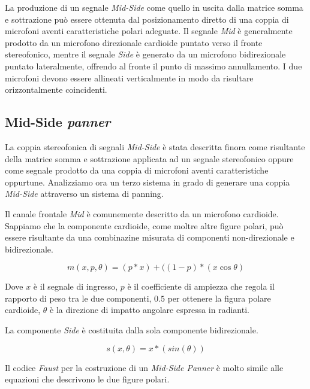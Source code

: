 La produzione di un segnale \emph{Mid-Side} come quello in uscita dalla matrice
somma e sottrazione può essere ottenuta dal posizionamento diretto di una coppia
di microfoni aventi caratteristiche polari adeguate. Il segnale \emph{Mid} è
generalmente prodotto da un microfono direzionale cardioide puntato verso il fronte
stereofonico, mentre il segnale \emph{Side} è generato da un microfono
bidirezionale puntato lateralmente, offrendo al fronte il punto di massimo
annullamento. I due microfoni devono essere allineati verticalmente in modo da
risultare orizzontalmente coincidenti.


\subsection{Mid-Side \emph{panner}}
\label{subsec:mspanner}

La coppia stereofonica di segnali \emph{Mid-Side} è stata descritta finora come
risultante della matrice somma e sottrazione applicata ad un segnale stereofonico
oppure come segnale prodotto da una coppia di microfoni aventi caratteristiche
oppurtune. Analizziamo ora un terzo sistema in grado di generare una coppia
\emph{Mid-Side} attraverso un sistema di panning.

Il canale frontale \emph{Mid} è comunemente descritto da un microfono cardioide.
Sappiamo che la componente cardioide, come moltre altre figure polari, può
essere risultante da una combinazine misurata di
componenti non-direzionale e bidirezionale.

\begin{equation}
m(x,p,\theta) = (p*x) + ((1-p)*(x\cos\theta)
\label{eq:mid}
\end{equation}

Dove $x$ è il segnale di ingresso, $p$ è il coefficiente di ampiezza che regola
il rapporto di peso tra le due componenti, $0.5$ per ottenere la figura polare
cardioide, $\theta$ è la direzione di impatto angolare espressa in radianti.

La componente \emph{Side} è costituita dalla sola componente bidirezionale.

\begin{equation}
s(x,\theta) = x*(sin(\theta))
\label{eq:side}
\end{equation}

Il codice \emph{Faust} per la costruzione di un \emph{Mid-Side Panner} è
molto simile alle equazioni che descrivono le due figure polari.

